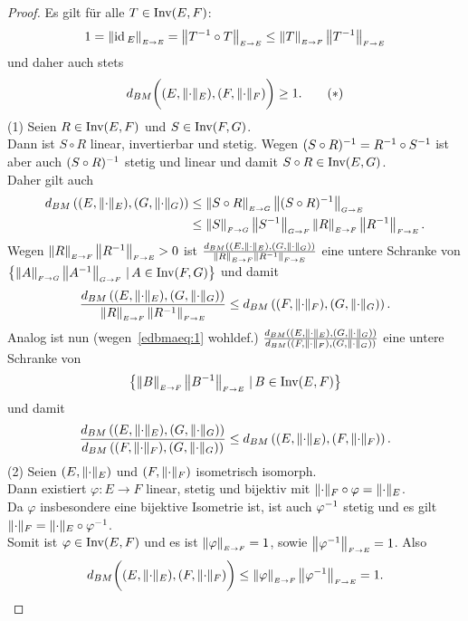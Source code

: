 \begin{proof}
Es gilt für alle $T \in \Inv(E, F)$:
\[ 1 = \opnorm{\id_E}EE = \opnorm{T\inv \circ T} E E
\le \opnorm T EF \opnorm{T\inv}FE\]
und daher auch stets
\begin{align}d_{BM}\bigg((E, \norm\cdot_E), (F, \norm\cdot_F)\bigg) \ge 1\text.
\tag{$\ast$}\label{edbmaeq:1}
\end{align}
(1) Seien $R \in \Inv(E, F)$ und $S \in \Inv(F, G)$.\\
Dann ist $S \circ R$ linear, invertierbar und stetig. Wegen $(S \circ R)\inv
= R\inv \circ S\inv$ ist aber auch $(S \circ R)\inv$ stetig und linear und
damit $S \circ R \in \Inv(E, G)$.\\
Daher gilt auch
\begin{align*}d_{BM}\left( (E, \norm\cdot_E), (G, \norm\cdot_G)\right)
&\le \opnorm{S\circ R}EG \opnorm{(S \circ R)\inv}G E\\
&\le \opnorm SFG \opnorm{S\inv}GF \opnorm REF \opnorm{R\inv}FE\text.
\end{align*}
Wegen $\opnorm REF \opnorm{R\inv}FE > 0$ ist
$\frac{d_{BM}\left( (E, \norm\cdot_E), (G, \norm\cdot_G)\right)}
{\opnorm REF \opnorm{R\inv}FE}$ eine untere Schranke von
$\menge{\opnorm A F G \opnorm{A\inv}GF}{A \in \Inv(F,G)}$ und damit
\[\frac{d_{BM}\left( (E, \norm\cdot_E), (G, \norm\cdot_G)\right)}
{\opnorm REF \opnorm{R\inv}FE} \le 
d_{BM}\left( (F, \norm\cdot_F), (G, \norm\cdot_G)\right)\text.\]
Analog ist nun (wegen~\eqref{edbmaeq:1} wohldef.) $\frac{d_{BM}\left((E, \norm\cdot_E), 
(G, \norm\cdot_G)\right)}{d_{BM}\left( (F, \norm\cdot_F), 
(G, \norm\cdot_G)\right)}$ eine untere Schranke von
\[\menge{\opnorm B E F \opnorm{B\inv}FE}{B \in \Inv(E,F)}\] und damit
\[\frac{d_{BM}\left( (E, \norm\cdot_E), 
(G, \norm\cdot_G)\right)}{d_{BM}\left( (F, \norm\cdot_F), 
(G, \norm\cdot_G)\right)} \le d_{BM}\left( (E, \norm\cdot_E), 
(F, \norm\cdot_F)\right)\text.\]
(2) Seien $(E, \norm\cdot_E)$ und $(F, \norm\cdot_F)$ isometrisch isomorph.\\
Dann existiert $\varphi : E \rightarrow F$ linear, stetig und bijektiv mit
$\norm \cdot _F \circ \varphi = \norm\cdot _E$.\\
Da $\varphi$ insbesondere eine bijektive Isometrie ist, ist auch $\varphi\inv$ stetig
und es gilt $\norm\cdot_F = \norm\cdot_E \circ \varphi \inv$.\\
Somit ist $\varphi \in \Inv(E, F)$ und es ist $\opnorm \varphi E F = 1$, sowie
$\opnorm {\varphi\inv} F E = 1$.
Also
\[d_{BM}\bigg((E, \norm\cdot_E), (F, \norm\cdot_F)\bigg)
\le \opnorm \varphi E F \opnorm {\varphi\inv} F E = 1\text.\]

\end{proof}
